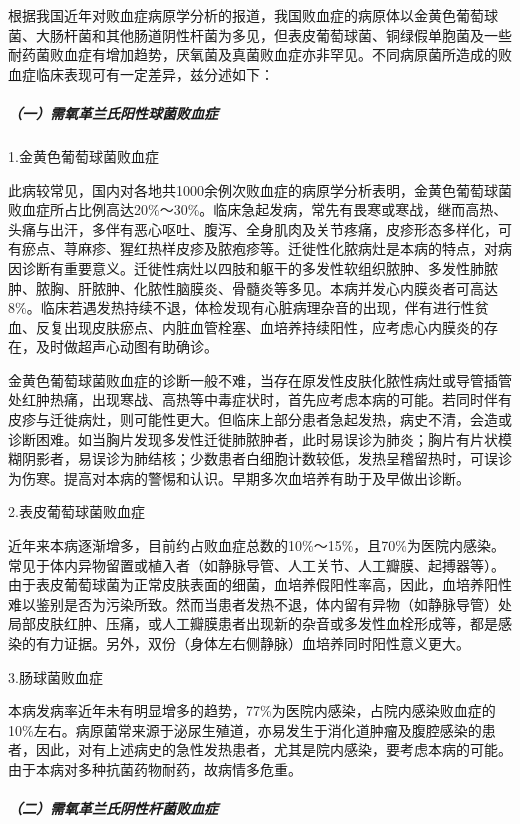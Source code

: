 根据我国近年对败血症病原学分析的报道，我国败血症的病原体以金黄色葡萄球菌、大肠杆菌和其他肠道阴性杆菌为多见，但表皮葡萄球菌、铜绿假单胞菌及一些耐药菌败血症有增加趋势，厌氧菌及真菌败血症亦非罕见。不同病原菌所造成的败血症临床表现可有一定差异，兹分述如下：

\subparagraph{（一）需氧革兰氏阳性球菌败血症}

\hypertarget{text00014.htmlux5cux23CHP2-5-1-2-7-1-1}{}
1.金黄色葡萄球菌败血症

此病较常见，国内对各地共1000余例次败血症的病原学分析表明，金黄色葡萄球菌败血症所占比例高达20\%～30\%。临床急起发病，常先有畏寒或寒战，继而高热、头痛与出汗，多伴有恶心呕吐、腹泻、全身肌肉及关节疼痛，皮疹形态多样化，可有瘀点、荨麻疹、猩红热样皮疹及脓疱疹等。迁徙性化脓病灶是本病的特点，对病因诊断有重要意义。迁徙性病灶以四肢和躯干的多发性软组织脓肿、多发性肺脓肿、脓胸、肝脓肿、化脓性脑膜炎、骨髓炎等多见。本病并发心内膜炎者可高达8\%。临床若遇发热持续不退，体检发现有心脏病理杂音的出现，伴有进行性贫血、反复出现皮肤瘀点、内脏血管栓塞、血培养持续阳性，应考虑心内膜炎的存在，及时做超声心动图有助确诊。

金黄色葡萄球菌败血症的诊断一般不难，当存在原发性皮肤化脓性病灶或导管插管处红肿热痛，出现寒战、高热等中毒症状时，首先应考虑本病的可能。若同时伴有皮疹与迁徙病灶，则可能性更大。但临床上部分患者急起发热，病史不清，会造或诊断困难。如当胸片发现多发性迁徙肺脓肿者，此时易误诊为肺炎；胸片有片状模糊阴影者，易误诊为肺结核；少数患者白细胞计数较低，发热呈稽留热时，可误诊为伤寒。提高对本病的警惕和认识。早期多次血培养有助于及早做出诊断。

\hypertarget{text00014.htmlux5cux23CHP2-5-1-2-7-1-2}{}
2.表皮葡萄球菌败血症

近年来本病逐渐增多，目前约占败血症总数的10\%～15\%，且70\%为医院内感染。常见于体内异物留置或植入者（如静脉导管、人工关节、人工瓣膜、起搏器等）。由于表皮葡萄球菌为正常皮肤表面的细菌，血培养假阳性率高，因此，血培养阳性难以鉴别是否为污染所致。然而当患者发热不退，体内留有异物（如静脉导管）处局部皮肤红肿、压痛，或人工瓣膜患者出现新的杂音或多发性血栓形成等，都是感染的有力证据。另外，双份（身体左右侧静脉）血培养同时阳性意义更大。

\hypertarget{text00014.htmlux5cux23CHP2-5-1-2-7-1-3}{}
3.肠球菌败血症

本病发病率近年未有明显增多的趋势，77\%为医院内感染，占院内感染败血症的10\%左右。病原菌常来源于泌尿生殖道，亦易发生于消化道肿瘤及腹腔感染的患者，因此，对有上述病史的急性发热患者，尤其是院内感染，要考虑本病的可能。由于本病对多种抗菌药物耐药，故病情多危重。

\subparagraph{（二）需氧革兰氏阴性杆菌败血症}

